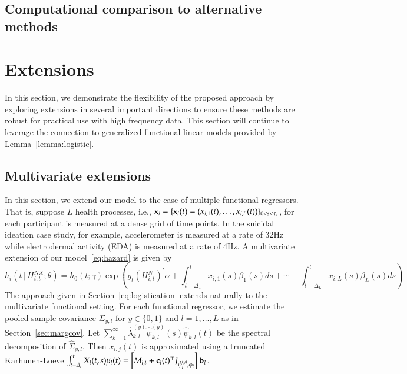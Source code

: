 \documentclass[12pt]{amsart}
\def\given{\, | \,}
\def\bfx{{\bf x}}
\begin{document}
\subsection{Computational comparison to alternative methods} \label{section:simcomparisons}


\section{Extensions}
\label{section:extensions}

In this section, we demonstrate the flexibility of the proposed approach by exploring extensions in several important directions to ensure these methods are robust for practical use with high frequency data. This section will continue to leverage the connection to generalized functional linear models provided by Lemma~\ref{lemma:logistic}.

\subsection{Multivariate extensions}
\label{section:multiplesensors}

In this section, we extend our model to the case of multiple functional regressors.  That is, suppose $L$ health processes, i.e., $\bfx_i = \{ \bfx_i (t) = (x_{i,1} (t), \ldots, x_{i,L} (t)) \}_{0 < s < \tau_i}$, for each participant is measured at a dense grid of time points. In the suicidal ideation case study, for example, accelerometer is measured at a rate of 32Hz while electrodermal activity (EDA) is measured at a rate of 4Hz.  A multivariate extension of our model~\eqref{eq:hazard} is given by
\begin{equation}
\label{eq:multihazardlinear}
h_i \left( t \given  H_{i,t}^{NX} ; \theta \right) =
h_0 (t; \gamma) \exp \left( g_t \left( H_{i,t}^{N} \right)^{\prime} \alpha
  + \int_{t-\Delta_1}^t x_{i,1} (s) \beta_1(s) ds + \cdots + \int_{t-\Delta_L}^t x_{i,L} (s) \beta_L(s) ds  \right)
\end{equation}
The approach given in Section~\ref{eq:logistication} extends naturally to the multivariate functional setting. For each functional regressor, we estimate the pooled sample covariance $\Sigma_{y,l}$ for $y \in \{0,1\}$ and $l=1,\ldots,L$ as in Section~\ref{sec:margcov}.  Let $\sum_{k=1}^\infty \hat \lambda^{(y)}_{k,l} \hat \psi^{(y)}_{k,l} (s) \hat \psi_{k,l}(t)$ be the spectral decomposition of $\hat \Sigma_{y,l}$.  Then $x_{i,j}(t)$ is approximated using a truncated Karhunen-Loeve $\int_{t-\Delta_l}^t X_{l} (t,s) \beta_l(t) = \left[M_{l,t} + {\bf c}_l (t)^\top J_{\hat \psi_l^{(y)}, \phi_l} \right] {\bf b}_l$.
\end{document}
